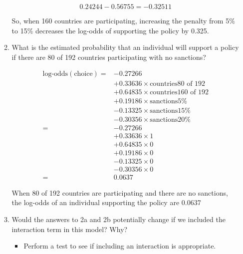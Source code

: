 \documentclass[12pt,letterpaper]{article}
\begin{document}
\begin{enumerate}
\begin{enumerate}
		\begin{equation}
			0.24244 - 0.56755 = -0.32511
		\end{equation}
		
		So, when 160 countries are participating, increasing the penalty from 5\% to 15\% decreases the log-odds of supporting the policy by 0.325.
		\item
		What is the estimated probability that an individual will support a policy if there are 80 of 192 countries participating with no sanctions?
		
		\begin{equation}
			\begin{split}
				\text{log-odds}(\text{choice}) = & -0.27266 \\
				& + 0.33636 \times \text{countries80 of 192} \\
				& + 0.64835 \times \text{countries160 of 192} \\
				& + 0.19186 \times \text{sanctions5\%} \\
				& - 0.13325 \times \text{sanctions15\%} \\
				& - 0.30356 \times \text{sanctions20\%}\\
				= &  -0.27266 \\
				& + 0.33636 \times 1 \\
				& + 0.64835 \times 0 \\
				& + 0.19186 \times 0 \\
				& - 0.13325 \times 0 \\
				& - 0.30356 \times 0 \\
				= & 0.0637
			\end{split}
		\end{equation}
		 
		 When 80 of 192 countries are participating and there are no sanctions, the log-odds of an individual supporting the policy are 0.0637
		 
		\item
		Would the answers to 2a and 2b potentially change if we included the interaction term in this model? Why? 
		\begin{itemize}
			\item Perform a test to see if including an interaction is appropriate.
		\end{itemize}
		

\end{enumerate}
\end{enumerate}
\end{document}
